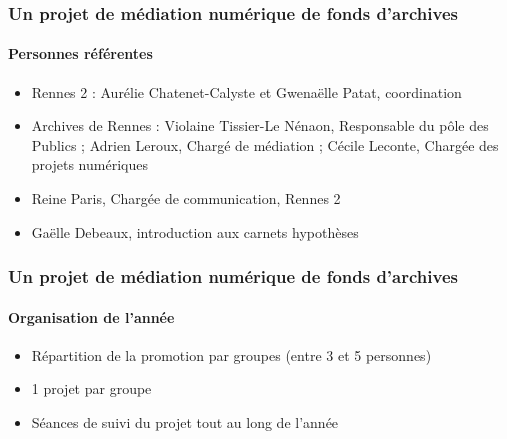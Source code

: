 \documentclass[xcolor=table]{beamer}
\begin{document}
\begin{frame}[plain]
\frametitle{Un projet de m\'ediation num\'erique de fonds d'archives}
\framesubtitle{Personnes r\'ef\'erentes}
\begin{itemize}
    \item Rennes 2 : Aur\'elie Chatenet-Calyste et Gwena\"elle Patat,
coordination
    \item Archives de Rennes : Violaine Tissier-Le N\'enaon, Responsable du p\^ole des Publics ; Adrien Leroux, Charg\'e de m\'ediation ; C\'ecile Leconte, Charg\'ee des projets num\'eriques 
    \item Reine Paris, Charg\'ee de communication, Rennes 2
    \item Ga\"elle Debeaux, introduction aux carnets hypoth\`eses
\end{itemize}
\end{frame}

\begin{frame}[plain]
\frametitle{Un projet de m\'ediation num\'erique de fonds d'archives}
\framesubtitle{Organisation de l'ann\'ee}
\begin{itemize}
    \item R\'epartition de la promotion par groupes (entre 3 et 5 personnes)
    \item 1 projet par groupe
    \item S\'eances de suivi du projet tout au long de l'ann\'ee
\end{itemize}
\end{frame}
\end{document}
